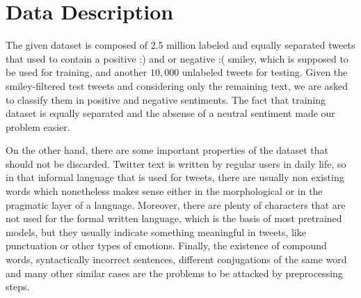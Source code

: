 \section{Data Description}
\label{sec:data_description}
The given dataset is composed of 2.5 million labeled and equally separated tweets that used to contain a positive :) and or negative :( smiley, which is supposed to be used for training, and another $10,000$ unlabeled tweets for testing. 
Given the smiley-filtered test tweets and considering only the remaining text, we are asked to classify them in positive and negative sentiments. 
The fact that training dataset is equally separated and the absense of a neutral sentiment made our problem easier. 

On the other hand, there are some important properties of the dataset that should not be discarded. 
Twitter text is written by regular users in daily life, so in that informal language that is used for tweets, there are usually non existing words which nonetheless makes sense either in the morphological or in the pragmatic layer of a language. 
Moreover, there are plenty of characters that are not used for the formal written language, which is the basis of most pretrained models, but they usually indicate something meaningful in tweets, like punctuation or other types of emotions. 
Finally, the existence of compound words, syntactically incorrect sentences, different conjugations of the same word and many other similar cases are the problems to be attacked by preprocessing steps.